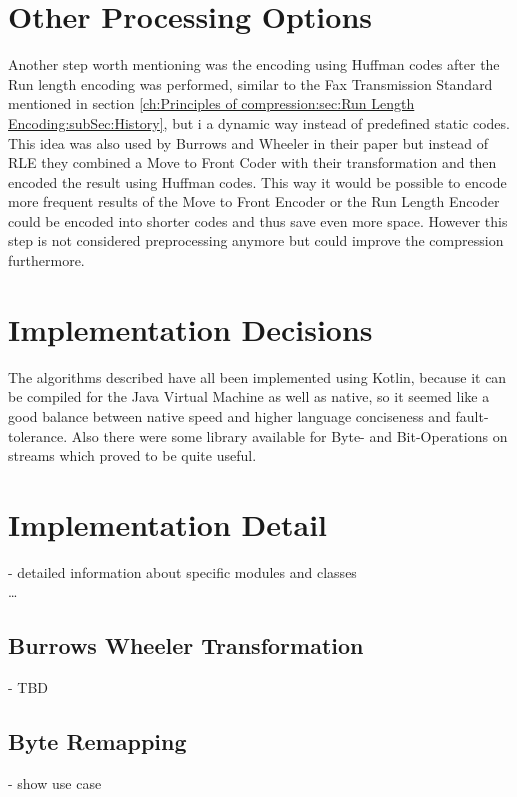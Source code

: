 {\section{Other Processing Options}
\label{ch:Conceptual Design:sec:Postprocessing}
Another step worth mentioning was the encoding using Huffman codes after the Run length encoding was performed, similar to the Fax Transmission Standard mentioned in section \ref{ch:Principles of compression:sec:Run Length Encoding:subSec:History}, but i a dynamic way instead of predefined static codes. This idea was also used by Burrows and Wheeler in their paper \cite{Burrows94} but instead of RLE they combined a Move to Front Coder with their transformation and then encoded the result using Huffman codes. This way it would be possible to encode more frequent results of the Move to Front Encoder or the Run Length Encoder could be encoded into shorter codes and thus save even more space. However this step is not considered preprocessing anymore but could improve the compression furthermore.

\section{Implementation Decisions}
\label{ch:Conceptual Design:sec:Implementation Decisions}

The algorithms described have all been implemented using Kotlin, because it can be compiled for the Java Virtual Machine as well as native, so it seemed like a good balance between native speed and higher language conciseness and fault-tolerance. Also there were some library available for Byte- and Bit-Operations on streams which proved to be quite useful.

\section{Implementation Detail}
\label{ch:Conceptual Design:sec:Implementation Detail}
- detailed information about specific modules and classes\\
\ldots

\subsection{Burrows Wheeler Transformation}
- TBD\\
\subsection{Byte Remapping}
- show use case \\

}
